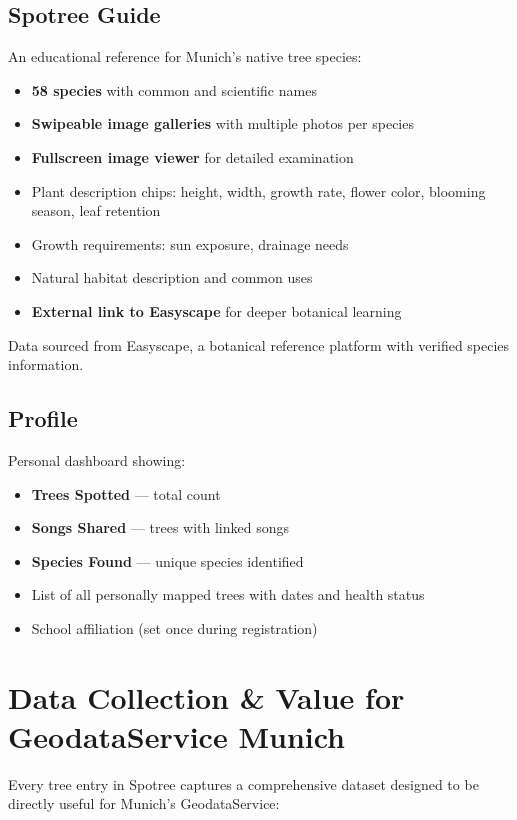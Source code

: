 \documentclass[11pt,a4paper]{article}
\begin{document}
\subsection{Spotree Guide}
An educational reference for Munich's native tree species:
\begin{itemize}[nosep]
  \item \textbf{58 species} with common and scientific names
  \item \textbf{Swipeable image galleries} with multiple photos per species
  \item \textbf{Fullscreen image viewer} for detailed examination
  \item Plant description chips: height, width, growth rate, flower color, blooming season, leaf retention
  \item Growth requirements: sun exposure, drainage needs
  \item Natural habitat description and common uses
  \item \textbf{External link to Easyscape} for deeper botanical learning
\end{itemize}

Data sourced from Easyscape, a botanical reference platform with verified species information.

\subsection{Profile}
Personal dashboard showing:
\begin{itemize}[nosep]
  \item \textbf{Trees Spotted} --- total count
  \item \textbf{Songs Shared} --- trees with linked songs
  \item \textbf{Species Found} --- unique species identified
  \item List of all personally mapped trees with dates and health status
  \item School affiliation (set once during registration)
\end{itemize}

\section{Data Collection \& Value for GeodataService Munich}

Every tree entry in Spotree captures a comprehensive dataset designed to be directly useful for Munich's GeodataService:
\end{document}
